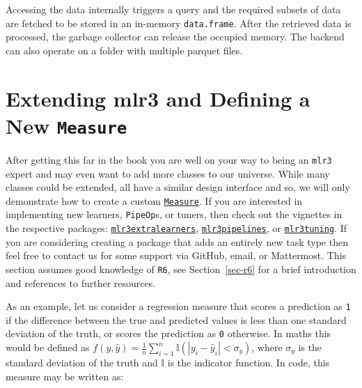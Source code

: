 Accessing the data internally triggers a query and the required subsets
of data are fetched to be stored in an in-memory \texttt{data.frame}.
After the retrieved data is processed, the garbage collector can release
the occupied memory. The backend can also operate on a folder with
multiple parquet files.

\hypertarget{sec-extending}{%
\section{\texorpdfstring{Extending mlr3 and Defining a New
\texttt{Measure}}{Extending mlr3 and Defining a New Measure}}\label{sec-extending}}

After getting this far in the book you are well on your way to being an
\texttt{mlr3} expert and may even want to add more classes to our
universe. While many classes could be extended, all have a similar
design interface and so, we will only demonstrate how to create a custom
\href{https://mlr3.mlr-org.com/reference/Measure.html}{\texttt{Measure}}.
If you are interested in implementing new learners, \texttt{PipeOp}s, or
tuners, then check out the vignettes in the respective packages:
\href{https://mlr3extralearners.mlr-org.com}{\texttt{mlr3extralearners}},
\href{https://mlr3pipelines.mlr-org.com}{\texttt{mlr3pipelines}},
or
\href{https://mlr3tuning.mlr-org.com}{\texttt{mlr3tuning}}.
If you are considering creating a package that adds an entirely new task
type then feel free to contact us for some support via GitHub, email, or
Mattermost. This section assumes good knowledge of \texttt{R6}, see
Section~\ref{sec-r6} for a brief introduction and references to further
resources.

As an example, let us consider a regression measure that scores a
prediction as \texttt{1} if the difference between the true and
predicted values is less than one standard deviation of the truth, or
scores the prediction as \texttt{0} otherwise. In maths this would be
defined as
\(f(y, \hat{y}) = \frac{1}{n} \sum_{i=1}^n \mathbb{I}(|y_i - \hat{y}_i| < \sigma_y)\),
where \(\sigma_y\) is the standard deviation of the truth and
\(\mathbb{I}\) is the indicator function. In code, this measure may be
written as:

\begin{Shaded}
\begin{Highlighting}[]
\OtherTok{=} 
  \NormalTok{(}\NormalTok{(}\SpecialCharTok{{-}}\SpecialCharTok{\textless{}} \NormalTok{, }\NormalTok{))}
\NormalTok{\}}

\NormalTok{(}\NormalTok{(}\NormalTok{, }\NormalTok{, }\NormalTok{), }\NormalTok{(}\NormalTok{, }\NormalTok{, }\NormalTok{))}
\end{Highlighting}
\end{Shaded}

